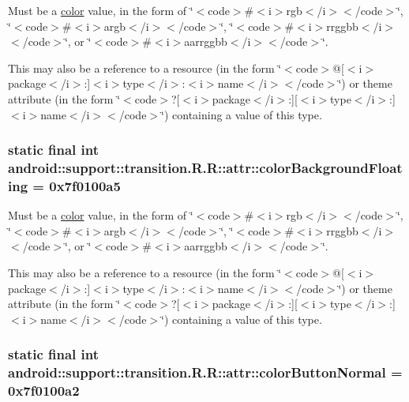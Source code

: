 Must be a \hyperlink{classandroid_1_1support_1_1transition_1_1_r_1_1color}{color} value, in the form of \char`\"{}$<$code$>$\#$<$i$>$rgb$<$/i$>$$<$/code$>$\char`\"{}, \char`\"{}$<$code$>$\#$<$i$>$argb$<$/i$>$$<$/code$>$\char`\"{}, \char`\"{}$<$code$>$\#$<$i$>$rrggbb$<$/i$>$$<$/code$>$\char`\"{}, or \char`\"{}$<$code$>$\#$<$i$>$aarrggbb$<$/i$>$$<$/code$>$\char`\"{}. 

This may also be a reference to a resource (in the form \char`\"{}$<$code$>$@\mbox{[}$<$i$>$package$<$/i$>$:\mbox{]}$<$i$>$type$<$/i$>$:$<$i$>$name$<$/i$>$$<$/code$>$\char`\"{}) or theme attribute (in the form \char`\"{}$<$code$>$?\mbox{[}$<$i$>$package$<$/i$>$:\mbox{]}\mbox{[}$<$i$>$type$<$/i$>$:\mbox{]}$<$i$>$name$<$/i$>$$<$/code$>$\char`\"{}) containing a value of this type. \hypertarget{classandroid_1_1support_1_1transition_1_1_r_1_1attr_912e230f9a23b19cd9d3e098e124b32c}{
\subsubsection[{colorBackgroundFloating}]{\setlength{\rightskip}{0pt plus 5cm}static final int android::support::transition.R.R::attr::colorBackgroundFloating = 0x7f0100a5}}
\label{classandroid_1_1support_1_1transition_1_1_r_1_1attr_912e230f9a23b19cd9d3e098e124b32c}


Must be a \hyperlink{classandroid_1_1support_1_1transition_1_1_r_1_1color}{color} value, in the form of \char`\"{}$<$code$>$\#$<$i$>$rgb$<$/i$>$$<$/code$>$\char`\"{}, \char`\"{}$<$code$>$\#$<$i$>$argb$<$/i$>$$<$/code$>$\char`\"{}, \char`\"{}$<$code$>$\#$<$i$>$rrggbb$<$/i$>$$<$/code$>$\char`\"{}, or \char`\"{}$<$code$>$\#$<$i$>$aarrggbb$<$/i$>$$<$/code$>$\char`\"{}. 

This may also be a reference to a resource (in the form \char`\"{}$<$code$>$@\mbox{[}$<$i$>$package$<$/i$>$:\mbox{]}$<$i$>$type$<$/i$>$:$<$i$>$name$<$/i$>$$<$/code$>$\char`\"{}) or theme attribute (in the form \char`\"{}$<$code$>$?\mbox{[}$<$i$>$package$<$/i$>$:\mbox{]}\mbox{[}$<$i$>$type$<$/i$>$:\mbox{]}$<$i$>$name$<$/i$>$$<$/code$>$\char`\"{}) containing a value of this type. \hypertarget{classandroid_1_1support_1_1transition_1_1_r_1_1attr_2498878fd75a516a904bdf783a4e4923}{
\subsubsection[{colorButtonNormal}]{\setlength{\rightskip}{0pt plus 5cm}static final int android::support::transition.R.R::attr::colorButtonNormal = 0x7f0100a2}}
\label{classandroid_1_1support_1_1transition_1_1_r_1_1attr_2498878fd75a516a904bdf783a4e4923}


